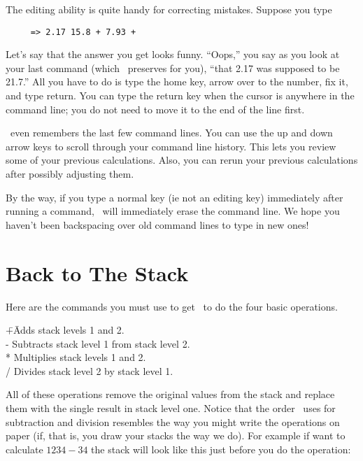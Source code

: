 The editing ability is quite handy for correcting mistakes. Suppose you type

\begin{verbatim}
     => 2.17 15.8 + 7.93 +
\end{verbatim}

Let's say that the answer you get looks funny. ``Oops,'' you say as you look at your last
command (which \CLAC\ preserves for you), ``that 2.17 was supposed to be 21.7.'' All you have to
do is type the home key, arrow over to the number, fix it, and type return. You can type the
return key when the cursor is anywhere in the command line; you do not need to move it to the
end of the line first.

\CLAC\ even remembers the last few command lines. You can use the up and down arrow keys to
scroll through your command line history. This lets you review some of your previous
calculations. Also, you can rerun your previous calculations after possibly adjusting them.

By the way, if you type a normal key (ie not an editing key) immediately after running a
command, \CLAC\ will immediately erase the command line. We hope you haven't been backspacing
over old command lines to type in new ones!

\section{Back to The Stack}

Here are the commands you must use to get \CLAC\ to do the four basic operations.

\begin{tabbing}
\hspace*{3em}\=+\hspace{3em}\=Adds stack levels 1 and 2.\\
\>              -\>            Subtracts stack level 1 from stack level 2.\\
\>              *\>            Multiplies stack levels 1 and 2.\\
\>              /\>            Divides stack level 2 by stack level 1.\\
\end{tabbing}

All of these operations remove the original values from the stack and replace them with the
single result in stack level one. Notice that the order \CLAC\ uses for subtraction and division
resembles the way you might write the operations on paper (if, that is, you draw your stacks the
way we do). For example if want to calculate $1234 - 34$ the stack will look like this just
before you do the operation:

